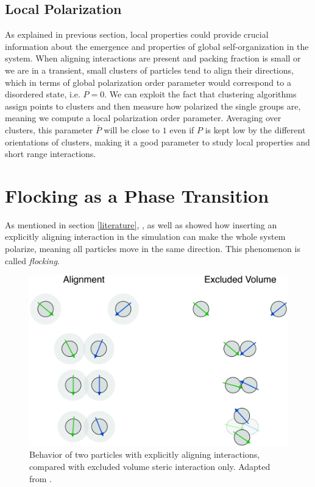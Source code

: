 \documentclass[../../master_thesis_np.tex]{subfiles}
\begin{document}
		\subsection{Local Polarization}
		As explained in previous section, local properties could provide crucial information about the emergence and properties of global self-organization in the system. 
		When aligning interactions are present and packing fraction is small or we are in a transient, small clusters of particles tend to align their directions, which in terms of global polarization order parameter would correspond to a disordered state, i.e. $P = 0$. 
		We can exploit the fact that clustering algorithms assign points to clusters and then measure how polarized the single groups are, meaning we compute a local polarization order parameter. 
		Averaging over clusters, this parameter $\bar{P}$ will be close to $1$ even if $P$ is kept low by the different orientations of clusters, making it a good parameter to study local properties and short range interactions.
		
		\section{Flocking as a Phase Transition} \label{phasetrans}
		As mentioned in section \ref{literature}, \citeauthor{martin-gomez_collective_2018}, as well as \citeauthor{negi_emergent_2022} \cite{martin-gomez_collective_2018, negi_emergent_2022} showed how inserting an explicitly aligning interaction in the simulation can make the whole system polarize, meaning all particles move in the same direction. 
		This phenomenon is called \emph{flocking}.
		
		\begin{figure}[htp]
			\centering
			\includegraphics[width=\textwidth]{alignment.png}
			\caption{Behavior of two particles with explicitly aligning interactions, compared with excluded volume steric interaction only. Adapted from \cite{martin-gomez_collective_2018}.}
			\label{fig:alignment}
		\end{figure}
		
\end{document}
